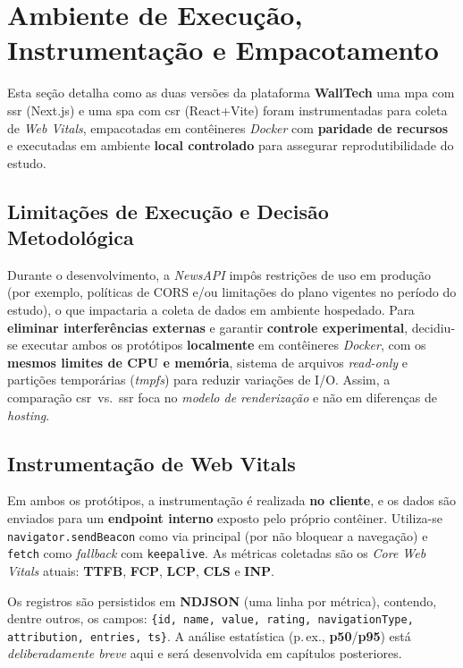 \section{Ambiente de Execução, Instrumentação e Empacotamento}
\label{sec:ambiente-instrumentacao-empacotamento}

Esta seção detalha como as duas versões da plataforma \textbf{WallTech} uma \acrshort{mpa} com \acrshort{ssr} (Next.js) e uma \acrshort{spa} com \acrshort{csr} (React+Vite) foram instrumentadas para coleta de \textit{Web Vitals}, empacotadas em contêineres \textit{Docker} com \textbf{paridade de recursos} e executadas em ambiente \textbf{local controlado} para assegurar reprodutibilidade do estudo.

\subsection{Limitações de Execução e Decisão Metodológica}
\label{ssec:limitacoes-execucao}

Durante o desenvolvimento, a \textit{NewsAPI} impôs restrições de uso em produção (por exemplo, políticas de CORS e/ou limitações do plano vigentes no período do estudo), o que impactaria a coleta de dados em ambiente hospedado. Para \textbf{eliminar interferências externas} e garantir \textbf{controle experimental}, decidiu-se executar ambos os protótipos \textbf{localmente} em contêineres \textit{Docker}, com os \textbf{mesmos limites de CPU e memória}, sistema de arquivos \textit{read-only} e partições temporárias (\textit{tmpfs}) para reduzir variações de I/O. Assim, a comparação \acrshort{csr}~vs.~\acrshort{ssr} foca no \textit{modelo de renderização} e não em diferenças de \textit{hosting}.

\subsection{Instrumentação de Web Vitals}
\label{ssec:instrumentacao-webvitals}

Em ambos os protótipos, a instrumentação é realizada \textbf{no cliente}, e os dados são enviados para um \textbf{endpoint interno} exposto pelo próprio contêiner. Utiliza-se \texttt{navigator.sendBeacon} como via principal (por não bloquear a navegação) e \texttt{fetch} como \textit{fallback} com \texttt{keepalive}. As métricas coletadas são os \textit{Core Web Vitals} atuais: \textbf{TTFB}, \textbf{FCP}, \textbf{LCP}, \textbf{CLS} e \textbf{INP}. 

Os registros são persistidos em \textbf{NDJSON} (uma linha por métrica), contendo, dentre outros, os campos:
\texttt{\{id, name, value, rating, navigationType, attribution, entries, ts\}}. A análise estatística (p.\,ex., \textbf{p50}/\textbf{p95}) está \textit{deliberadamente breve} aqui e será desenvolvida em capítulos posteriores.

